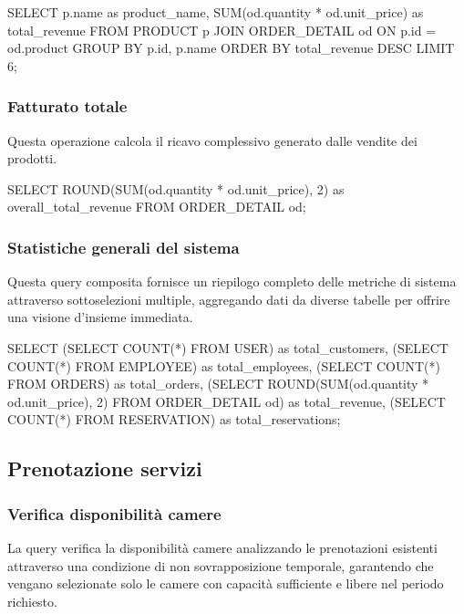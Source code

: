 \documentclass[a4paper,12pt]{report}
\begin{document}
\begin{sqlcode}[caption={Query per i prodotti per fatturato}]
SELECT p.name as product_name, SUM(od.quantity * od.unit_price) as total_revenue 
FROM PRODUCT p 
JOIN ORDER_DETAIL od ON p.id = od.product 
GROUP BY p.id, p.name 
ORDER BY total_revenue DESC 
LIMIT 6;
\end{sqlcode}

\subsubsection{Fatturato totale} 
Questa operazione calcola il ricavo complessivo generato dalle vendite dei prodotti.

\begin{sqlcode}[caption={Query per il fatturato totale}]
SELECT ROUND(SUM(od.quantity * od.unit_price), 2) as overall_total_revenue 
FROM ORDER_DETAIL od;
\end{sqlcode}

\subsubsection{Statistiche generali del sistema} 
Questa query composita fornisce un riepilogo completo delle metriche di sistema attraverso sottoselezioni multiple, aggregando dati da diverse tabelle per offrire una visione d'insieme immediata.

\begin{sqlcode}[caption={Query per le statistiche generali}]
SELECT (SELECT COUNT(*) FROM USER) as total_customers,
       (SELECT COUNT(*) FROM EMPLOYEE) as total_employees,
       (SELECT COUNT(*) FROM ORDERS) as total_orders,
       (SELECT ROUND(SUM(od.quantity * od.unit_price), 2) FROM ORDER_DETAIL od) as total_revenue,
       (SELECT COUNT(*) FROM RESERVATION) as total_reservations;
\end{sqlcode}

\subsection{Prenotazione servizi} 

\subsubsection{Verifica disponibilità camere} 
La query verifica la disponibilità camere analizzando le prenotazioni esistenti attraverso una condizione di non sovrapposizione temporale, garantendo che vengano selezionate solo le camere con capacità sufficiente e libere nel periodo richiesto.
\end{document}
